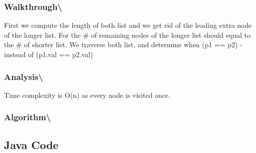 \documentclass[]{book}
\begin{document}
\hypertarget{walkthrough-112}{%
\subsubsection{Walkthrough\textbackslash{}}\label{walkthrough-112}}

First we compute the length of both list and we get rid of the leading extra node of the longer list.
For the \# of remaining nodes of the longer list should equal to the \# of shorter list. We traverse
both list, and determine when (p1 == p2) - instead of (p1.val == p2.val)

\hypertarget{analysis-119}{%
\subsubsection{Analysis\textbackslash{}}\label{analysis-119}}

Time complexity is O(n) as every node is visited once.

\hypertarget{algorithm-125}{%
\subsubsection{Algorithm\textbackslash{}}\label{algorithm-125}}

\hypertarget{java-code-74}{%
\subsection{Java Code}\label{java-code-74}}
\end{document}
